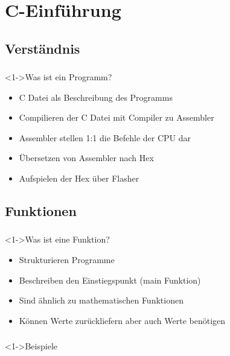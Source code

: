 \section{C-Einführung}
\subsection{Verständnis}
\begin{frame}
	\frametitle{\currentsection}
	\framesubtitle{\currentsubsection}
	\begin{block}<1->{Was ist ein Programm?}
		\begin{itemize}
			\item C Datei als Beschreibung des Programms
			\item Compilieren der C Datei mit Compiler zu Assembler
			\item Assembler stellen 1:1 die Befehle der CPU dar
			\item Übersetzen von Assembler nach Hex
			\item Aufspielen der Hex über Flasher
		\end{itemize}
	\end{block}
\end{frame}


\subsection{Funktionen}
\begin{frame}
	\frametitle{\currentsection}
	\framesubtitle{\currentsubsection}
	\begin{block}<1->{Was ist eine Funktion?}
		\begin{itemize}
			\item Strukturieren Programme
			\item Beschreiben den Einstiegspunkt (main Funktion)
			\item Sind ähnlich zu mathematischen Funktionen
			\item Können Werte zurückliefern aber auch Werte benötigen
		\end{itemize}
	\end{block}
\end{frame}
\begin{frame}
	\frametitle{\currentsection}
	\framesubtitle{\currentsubsection}
  \begin{block}<1->{Beispiele}
  	
  \end{block}
\end{frame}


